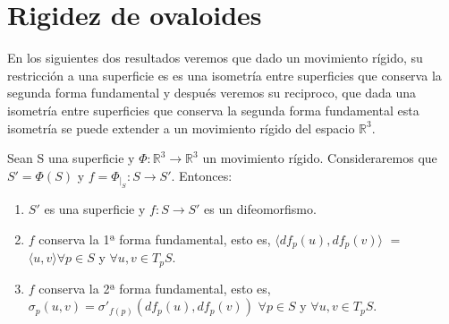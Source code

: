\chapter*{Rigidez de ovaloides}





En los siguientes dos resultados veremos que dado un movimiento rígido, su restricción a una superficie es es una isometría entre superficies que conserva la segunda forma fundamental y después veremos su reciproco, que dada una isometría entre superficies que conserva la segunda forma fundamental esta isometría se puede extender a un movimiento rígido del espacio $\mathbb{R}^3$.

\begin{proposicion}\label{prop:rig1} %
	Sean S una superficie y  $\Phi : \mathbb{R}^3 \to \mathbb{R}^3$  un movimiento rígido. Consideraremos que $S' = \Phi(S)$ y $f = \Phi_{\mid_{S}} : S \to S'$. Entonces:
	\begin{enumerate}
		\item $S'$ es una superficie y $f : S \to S'$ es un difeomorfismo.
		\item $f$ conserva la 1ª forma fundamental, esto es, $\langle df_p(u), df_p(v) \rangle $ $=$ $ \langle u, v \rangle \forall p \in S$ y $\forall u,v \in T_p S$.
		\item $f$ conserva la 2ª forma fundamental, esto es, $\sigma_p(u,v) = \sigma'_{f(p)}(df_p(u), df_p(v))$ $\forall p \in S$ y $\forall u,v \in T_p S$.
	\end{enumerate}
\end{proposicion}

